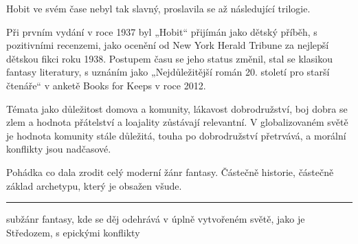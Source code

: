 \documentclass[FGBook.tex]{subfiles}
\begin{document}
\noindent Hobit ve svém čase nebyl tak slavný, proslavila se až následující trilogie.

Při prvním vydání v roce 1937 byl „Hobit“ přijímán jako dětský příběh,
s pozitivními recenzemi,
jako ocenění od New York Herald Tribune za nejlepší dětskou fikci roku 1938.
Postupem času se jeho status změnil, stal se klasikou fantasy literatury,
s uznáním jako „Nejdůležitější román 20. století pro starší čtenáře“
v anketě Books for Keeps v roce 2012.

\noindent Témata jako důležitost domova a komunity, lákavost dobrodružství,
boj dobra se zlem a hodnota přátelství a loajality zůstávají relevantní.
V globalizovaném světě je hodnota komunity stále důležitá, touha po dobrodružství přetrvává,
a morální konflikty jsou nadčasové.

\noindent 
Pohádka co dala zrodit celý moderní žánr fantasy. Částečně historie, částečně základ archetypu, který je obsažen všude.

\vfill

\noindent\begin{minipage}{\textwidth}
    {\textcolor{\wpagecolor}{\rule{\linewidth}{0.4pt}}
    \footnotesize
     subžánr fantasy, kde se děj odehrává v úplně vytvořeném světě,
    jako je Středozem, s epickými konflikty
    }
\end{minipage}

\newpage
\end{document}
